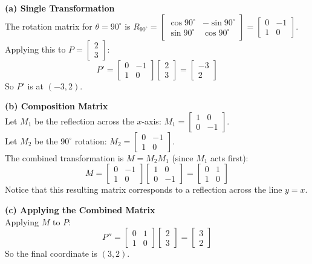 \begin{solution}
\textbf{(a) Single Transformation} \\
The rotation matrix for $\theta = 90^\circ$ is $R_{90^\circ} = \begin{bmatrix} \cos 90^\circ & -\sin 90^\circ \\ \sin 90^\circ & \cos 90^\circ \end{bmatrix} = \begin{bmatrix} 0 & -1 \\ 1 & 0 \end{bmatrix}$.
Applying this to $P = \begin{bmatrix} 2 \\ 3 \end{bmatrix}$:
\[
P' = \begin{bmatrix} 0 & -1 \\ 1 & 0 \end{bmatrix} \begin{bmatrix} 2 \\ 3 \end{bmatrix} = \begin{bmatrix} -3 \\ 2 \end{bmatrix}
\]
So $P'$ is at $(-3, 2)$.

\medskip
\textbf{(b) Composition Matrix} \\
Let $M_1$ be the reflection across the $x$-axis: $M_1 = \begin{bmatrix} 1 & 0 \\ 0 & -1 \end{bmatrix}$. \\
Let $M_2$ be the $90^\circ$ rotation: $M_2 = \begin{bmatrix} 0 & -1 \\ 1 & 0 \end{bmatrix}$. \\
The combined transformation is $M = M_2 M_1$ (since $M_1$ acts first):
\[
M = \begin{bmatrix} 0 & -1 \\ 1 & 0 \end{bmatrix} \begin{bmatrix} 1 & 0 \\ 0 & -1 \end{bmatrix} = \begin{bmatrix} 0 & 1 \\ 1 & 0 \end{bmatrix}
\]
Notice that this resulting matrix corresponds to a reflection across the line $y = x$.

\medskip
\textbf{(c) Applying the Combined Matrix} \\
Applying $M$ to $P$:
\[
P'' = \begin{bmatrix} 0 & 1 \\ 1 & 0 \end{bmatrix} \begin{bmatrix} 2 \\ 3 \end{bmatrix} = \begin{bmatrix} 3 \\ 2 \end{bmatrix}
\]
So the final coordinate is $(3, 2)$.
\end{solution}

